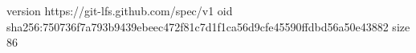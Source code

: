 version https://git-lfs.github.com/spec/v1
oid sha256:750736f7a793b9439ebeec472f81c7d1f1ca56d9cfe45590ffdbd56a50e43882
size 86
